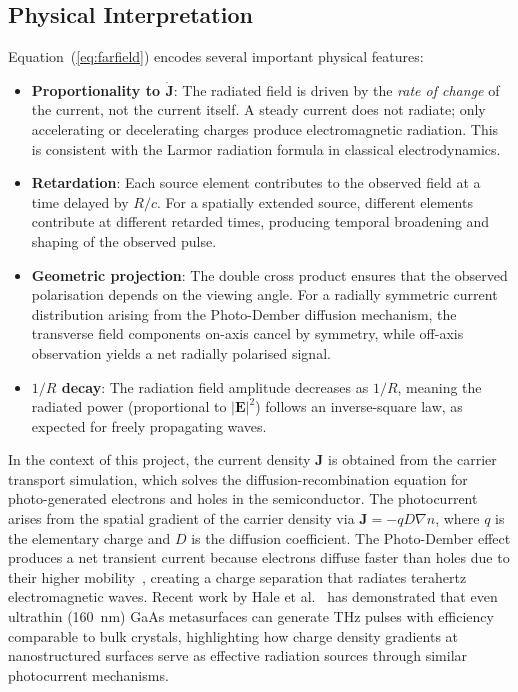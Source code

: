 \documentclass[12pt]{interim_report}
\begin{document}
\subsection{Physical Interpretation}
Equation~(\ref{eq:farfield}) encodes several important physical features:
\begin{itemize}
    \item \textbf{Proportionality to $\dot{\mathbf{J}}$}: The radiated field is driven by the \textit{rate of change} of the current, not the current itself. A steady current does not radiate; only accelerating or decelerating charges produce electromagnetic radiation. This is consistent with the Larmor radiation formula in classical electrodynamics.
    \item \textbf{Retardation}: Each source element contributes to the observed field at a time delayed by $R/c$. For a spatially extended source, different elements contribute at different retarded times, producing temporal broadening and shaping of the observed pulse.
    \item \textbf{Geometric projection}: The double cross product ensures that the observed polarisation depends on the viewing angle. For a radially symmetric current distribution arising from the Photo-Dember diffusion mechanism, the transverse field components on-axis cancel by symmetry, while off-axis observation yields a net radially polarised signal.
    \item \textbf{$1/R$ decay}: The radiation field amplitude decreases as $1/R$, meaning the radiated power (proportional to $|\mathbf{E}|^2$) follows an inverse-square law, as expected for freely propagating waves.
\end{itemize}

In the context of this project, the current density $\mathbf{J}$ is obtained from the carrier transport simulation, which solves the diffusion-recombination equation for photo-generated electrons and holes in the semiconductor. The photocurrent arises from the spatial gradient of the carrier density via $\mathbf{J} = -qD\nabla n$, where $q$ is the elementary charge and $D$ is the diffusion coefficient. The Photo-Dember effect produces a net transient current because electrons diffuse faster than holes due to their higher mobility~\cite{Reklaitis2010}, creating a charge separation that radiates terahertz electromagnetic waves. Recent work by Hale et al.~\cite{Hale2022} has demonstrated that even ultrathin (160~nm) GaAs metasurfaces can generate THz pulses with efficiency comparable to bulk crystals, highlighting how charge density gradients at nanostructured surfaces serve as effective radiation sources through similar photocurrent mechanisms.
\end{document}
